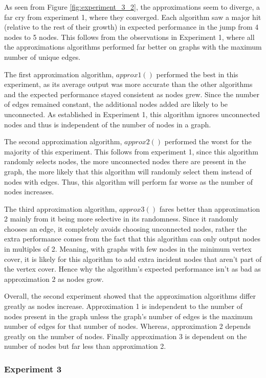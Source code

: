 \documentclass[titlepage]{article}
\begin{document}
As seen from Figure \ref{fig:experiment_3_2}, the approximations seem to diverge, a far cry from experiment 1, where they converged. Each algorithm saw a major hit (relative to the rest of their growth) in expected performance in the jump from 4 nodes to 5 nodes. This follows from the observations in Experiment 1, where all the approximations algorithms performed far better on graphs with the maximum number of unique edges.

The first approximation algorithm, $approx1()$ performed the best in this experiment, as its average output was more accurate than the other algorithms and the expected performance stayed consistent as nodes grew. Since the number of edges remained constant, the additional nodes added are likely to be unconnected. As established in Experiment 1, this algorithm ignores unconnected nodes and thus is independent of the number of nodes in a graph.

The second approximation algorithm, $approx2()$ performed the worst for the majority of this experiment. This follows from experiment 1, since this algorithm randomly selects nodes, the more unconnected nodes there are present in the graph, the more likely that this algorithm will randomly select them instead of nodes with edges. Thus, this algorithm will perform far worse as the number of nodes increases.

The third approximation algorithm, $approx3()$ fares better than approximation 2 mainly from it being more selective in its randomness. Since it randomly chooses an edge, it completely avoids choosing unconnected nodes, rather the extra performance comes from the fact that this algorithm can only output nodes in multiples of 2. Meaning, with graphs with few nodes in the minimum vertex cover, it is likely for this algorithm to add extra incident nodes that aren't part of the vertex cover. Hence why the algorithm's expected performance isn't as bad as approximation 2 as nodes grow.

Overall, the second experiment showed that the approximation algorithms differ greatly as nodes increase. Approximation 1 is independent to the number of nodes present in the graph unless the graph's number of edges is the maximum number of edges for that number of nodes. Whereas, approximation 2 depends greatly on the number of nodes. Finally approximation 3 is dependent on the number of nodes but far less than approximation 2.

\subsubsection{Experiment 3}
\end{document}
